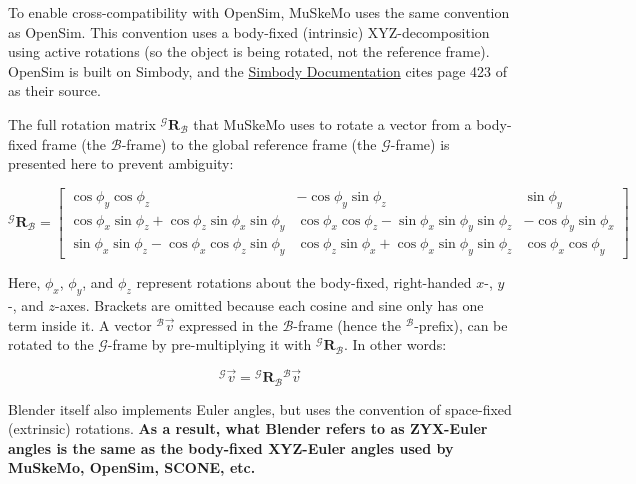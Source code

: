\documentclass{article}
\begin{document}
To enable cross-compatibility with OpenSim, MuSkeMo uses the same convention as OpenSim. This convention uses a body-fixed (intrinsic) XYZ-decomposition using active rotations (so the object is being rotated, not the reference frame). OpenSim is built on Simbody, and the \href{https://simtk.org/api_docs/molmodel/api_docs22/Simbody/html/classSimTK_1_1Rotation__.html}{Simbody Documentation} cites page 423 of \cite{kaneSpacecraftDynamics1983} as their source.

The full rotation matrix ${}^{\mathcal{G}} \mathbf{R}_{\mathcal{B}}$ that MuSkeMo uses to rotate a vector from a body-fixed frame (the ${\mathcal{B}}$-frame) to the global reference frame (the ${\mathcal{G}}$-frame) is presented here to prevent ambiguity:


\begin{equation}
    {}^{\mathcal{G}} \mathbf{R}_{\mathcal{B}} =
    \begin{bmatrix}
    \cos \phi_y \cos \phi_z & -\cos \phi_y \sin \phi_z & \sin \phi_y \\
    \cos \phi_x \sin \phi_z + \cos \phi_z \sin \phi_x \sin \phi_y & \cos \phi_x \cos \phi_z - \sin \phi_x \sin \phi_y \sin \phi_z & -\cos \phi_y \sin \phi_x \\
    \sin \phi_x \sin \phi_z - \cos \phi_x \cos \phi_z \sin \phi_y & \cos \phi_z \sin \phi_x + \cos \phi_x \sin \phi_y \sin \phi_z & \cos \phi_x \cos \phi_y
    \end{bmatrix}
\end{equation}
\label{eq:grbmatrix}

Here, \( \phi_x \), \( \phi_y \), and \( \phi_z \) represent rotations about the body-fixed, right-handed \( x \)-, \( y \)-, and \( z \)-axes. Brackets are omitted because each cosine and sine only has one term inside it. A vector \( {}^{\mathcal{B}}\vec{v} \) expressed in the \( \mathcal{B} \)-frame (hence the \( {}^\mathcal{B} \)-prefix), can be rotated to the \( \mathcal{G} \)-frame by pre-multiplying it with \( {}^{\mathcal{G}} \mathbf{R}_{\mathcal{B}} \). In other words:

\begin{equation}
{}^{\mathcal{G}}\vec{v} = {}^{\mathcal{G}} \mathbf{R}_{\mathcal{B}} { }^{\mathcal{B}}\vec{v}
\end{equation}

Blender itself also implements Euler angles, but uses the convention of space-fixed (extrinsic) rotations. \textbf{As a result, what Blender refers to as ZYX-Euler angles is the same as the body-fixed XYZ-Euler angles used by MuSkeMo, OpenSim, SCONE, etc.}
\end{document}

